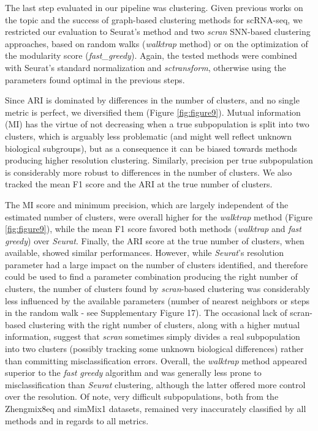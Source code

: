 \documentclass{bmcart}
\begin{document}
The last step evaluated in our pipeline was clustering. Given previous works on the topic \citep{duoClustering2018,freytagComparison2018} and the success of graph-based clustering methods for scRNA-seq, we restricted our evaluation to Seurat's method and two \textit{scran} SNN-based clustering approaches, based on random walks (\textit{walktrap} method) or on the optimization of the modularity score (\textit{fast\_greedy}). Again, the tested methods were combined with Seurat's standard normalization and \textit{sctransform}, otherwise using the parameters found optimal in the previous steps. 

Since ARI is dominated by differences in the number of clusters, and no single metric is perfect, we diversified them (Figure \ref{fig:figure9}). Mutual information (MI) has the virtue of not decreasing when a true subpopulation is split into two clusters, which is arguably less problematic (and might well reflect unknown biological subgroups), but as a consequence it can be biased towards methods producing higher resolution clustering. Similarly, precision per true subpopulation is considerably more robust to differences in the number of clusters. We also tracked the mean F1 score and the ARI at the true number of clusters. 

The MI score and minimum precision, which are largely independent of the estimated number of clusters, were overall higher for the \textit{walktrap} method (Figure \ref{fig:figure9}), while the mean F1 score favored both  methods (\textit{walktrap} and \textit{fast greedy}) over \textit{Seurat}. Finally, the ARI score at the true number of clusters, when available, showed similar performances. However, while \textit{Seurat}'s resolution parameter had a large impact on the number of clusters identified, and therefore could be used to find a parameter combination producing the right number of clusters, the number of clusters found by \textit{scran}-based clustering was considerably less influenced by the available parameters (number of nearest neighbors or steps in the random walk - see Supplementary Figure 17). The occasional lack of scran-based clustering with the right number of clusters, along with a higher mutual information, suggest that \textit{scran} sometimes simply divides a real subpopulation into two clusters (possibly tracking some unknown biological differences) rather than committing misclassification errors. Overall, the \textit{walktrap} method appeared superior to the \textit{fast greedy} algorithm and was generally less prone to misclassification than \textit{Seurat} clustering, although the latter offered more control over the resolution. Of note, very difficult subpopulations, both from the Zhengmix8eq and simMix1 datasets, remained very inaccurately classified by all methods and in regards to all metrics.
\end{document}
